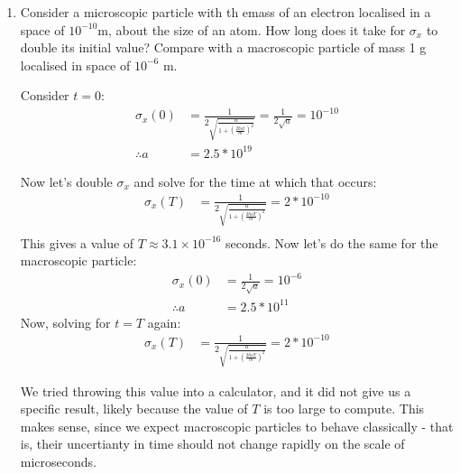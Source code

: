 \documentclass{article}
\begin{document}
\begin{enumerate}[label=(\alph*)]
\begin{solution}
    \end{solution}
    

    \begin{solution}
        
    \end{solution}
    \item Consider a microscopic particle with th emass of an electron localised in a space of $10^{-10}$m, about the size of an atom. How long does it take for $\sigma_x$ to double its initial value? Compare with a macroscopic particle of mass 1 g localised in space of $10^{-6}$ m.
    
    \begin{solution}
        Consider $t = 0$:
            \begin{align*}
                \sigma_x(0) &= \frac{1}{2\sqrt{\frac{a}{1 + \left(\frac{2\hbar a t}{m}\right)^2}}} = \frac{1}{2\sqrt{a}} = 10^{-10}\\
                \therefore a &= 2.5*10^{19}
            \end{align*}

            Now let's double $\sigma_x$ and solve for the time at which that occurs:
            \begin{align*}
                \sigma_x(T) &= \frac{1}{2\sqrt{\frac{a}{1 + \left(\frac{2\hbar a T}{m}\right)^2}}} =  2*10^{-10}\\
            \end{align*}
            This gives a value of $T \approx 3.1 \times 10^{-16}$ seconds. Now let's do the same for the macroscopic particle:
            \begin{align*}
                \sigma_x(0)&= \frac{1}{2\sqrt{a}} = 10^{-6}\\
                \therefore a &= 2.5*10^{11}
            \end{align*}
            Now, solving for $t = T$ again:
            \begin{align*}
                \sigma_x(T) &= \frac{1}{2\sqrt{\frac{a}{1 + \left(\frac{2\hbar a T}{m}\right)^2}}} = 2*10^{-10}
            \end{align*}

            We tried throwing this value into a calculator, and it did not give us a specific result, likely because the value of $T$ is too large to compute. This makes sense, since we expect macroscopic particles to behave classically - that is, their uncertianty in time should not change rapidly on the scale of microseconds.
        \end{solution}


\end{enumerate}
\end{document}

